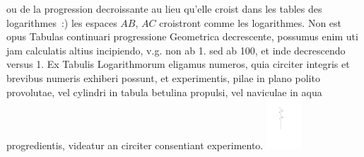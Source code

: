   ou de la progression decroissante au lieu qu'elle croist dans les tables des logarithmes~:) les espaces $AB$, $AC$ croistront comme les logarithmes.
   \pend
   \pstart
Non est opus Tabulas continuari progressione Geometrica decrescente, possumus enim uti jam calculatis altius incipiendo, v.g. non ab 1. sed ab 100, et inde decrescendo versus 1. Ex Tabulis Logarithmorum eligamus numeros, quia circiter integris et brevibus numeris exhiberi possunt, et experimentis, pilae in plano polito provolutae, vel cylindri in tabula betulina propulsi, vel naviculae in aqua progredientis, videatur an circiter consentiant experimento.
\pend
\count{}
\vspace{1.5em}
\pstart
    \noindent \centering \includegraphics[trim = 0mm -3mm 0mm 0mm, clip, width=0.1\textwidth]{images/lh03705_012v_2-d1.pdf}\\
     \noindent {}  %
    \pend